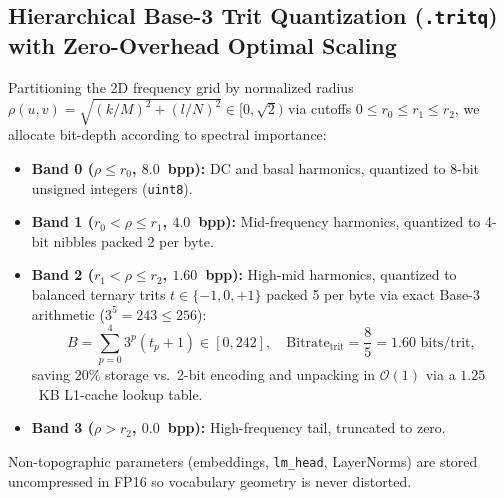 \documentclass[11pt,a4paper]{article}
\begin{document}
\subsection{Hierarchical Base-3 Trit Quantization (\texttt{.tritq}) with Zero-Overhead Optimal Scaling}
\label{sec:tritq}
Partitioning the 2D frequency grid by normalized radius $\rho(u, v) = \sqrt{(k/M)^2 + (l/N)^2} \in [0, \sqrt{2})$ via cutoffs $0 \le r_0 \le r_1 \le r_2$, we allocate bit-depth according to spectral importance:
\begin{itemize}
    \item \textbf{Band 0 ($\rho \le r_0$, $8.0$~bpp):} DC and basal harmonics, quantized to 8-bit unsigned integers (\texttt{uint8}).
    \item \textbf{Band 1 ($r_0 < \rho \le r_1$, $4.0$~bpp):} Mid-frequency harmonics, quantized to 4-bit nibbles packed 2 per byte.
    \item \textbf{Band 2 ($r_1 < \rho \le r_2$, $1.60$~bpp):} High-mid harmonics, quantized to balanced ternary trits $t \in \{-1, 0, +1\}$ packed 5 per byte via exact Base-3 arithmetic ($3^5 = 243 \le 256$):
    \begin{equation}
        B = \sum_{p=0}^{4} 3^p (t_p + 1) \in [0, 242], \quad \text{Bitrate}_{\text{trit}} = \frac{8}{5} = 1.60 \text{ bits/trit},
    \end{equation}
    saving $20\%$ storage vs.\ 2-bit encoding and unpacking in $\mathcal{O}(1)$ via a $1.25$~KB L1-cache lookup table.
    \item \textbf{Band 3 ($\rho > r_2$, $0.0$~bpp):} High-frequency tail, truncated to zero.
\end{itemize}
Non-topographic parameters (embeddings, \texttt{lm\_head}, LayerNorms) are stored uncompressed in FP16 so vocabulary geometry is never distorted.
\end{document}
